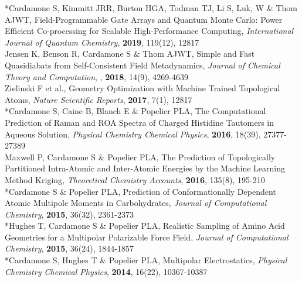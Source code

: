 \documentclass[11pt]{article} %
\begin{document}
*Cardamone S, Kimmitt JRR, Burton HGA, Todman TJ, Li S, Luk, W \& Thom AJWT, Field-Programmable Gate Arrays and Quantum Monte Carlo: Power Efficient Co-processing for Scalable High-Performance Computing, \textit{International Journal of Quantum Chemistry}, \textbf{2019}, 119(12), 12817 \\

Jensen K, Benson R, Cardamone S \& Thom AJWT, Simple and Fast Quasidiabats from Self-Consistent Field Metadynamics, \textit{Journal of Chemical Theory and Computation}, , \textbf{2018}, 14(9), 4269-4639 \\

Zielinski F et al., Geometry Optimization with Machine Trained Topological Atoms, \textit{Nature Scientific Reports}, \textbf{2017}, 7(1), 12817 \\

*Cardamone S, Caine B, Blanch E \& Popelier PLA, The Computational Prediction of Raman and ROA Spectra of Charged Histidine Tautomers in Aqueous Solution, \textit{Physical Chemistry Chemical Physics}, \textbf{2016}, 18(39), 27377-27389 \\

Maxwell P, Cardamone S \& Popelier PLA, The Prediction of Topologically Partitioned Intra-Atomic and Inter-Atomic Energies by the Machine Learning Method Kriging, \textit{Theoretical Chemistry Accounts}, \textbf{2016}, 135(8), 195-210\\

*Cardamone S \& Popelier PLA, Prediction of Conformationally Dependent Atomic Multipole Moments in Carbohydrates, \textit{Journal of Computational Chemistry}, \textbf{2015}, 36(32), 2361-2373\\

*Hughes T, Cardamone S \& Popelier PLA, Realistic Sampling of Amino Acid Geometries for a Multipolar Polarizable Force Field, \textit{Journal of Computational Chemistry}, \textbf{2015}, 36(24), 1844-1857\\

*Cardamone S, Hughes T \& Popelier PLA, Multipolar Electrostatics, \textit{Physical Chemistry Chemical Physics}, \textbf{2014}, 16(22), 10367-10387\\
\end{document}
